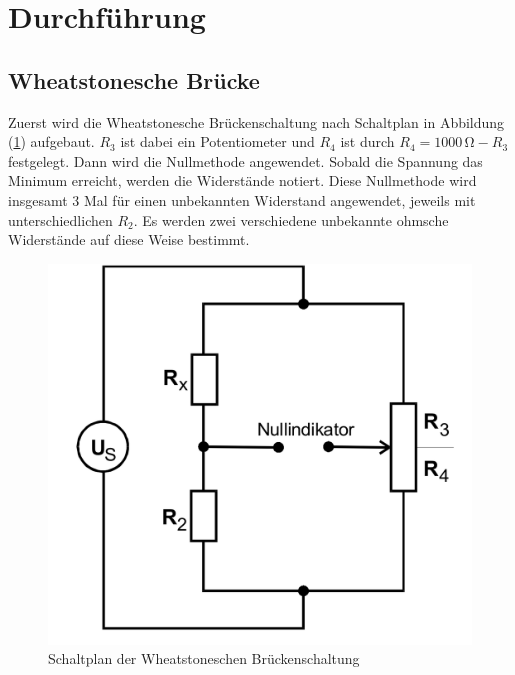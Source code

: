 \section{Durchführung}
%
\subsection{Wheatstonesche Brücke}
Zuerst wird die Wheatstonesche Brückenschaltung nach Schaltplan in Abbildung (\ref{pic:Wheatstonesche_Brueckenschaltung}) aufgebaut. $R_3$ ist dabei ein Potentiometer
und $R_4$ ist durch $R_4 = 1000 \, \unit{\ohm} - R_3 $ festgelegt. Dann wird die Nullmethode angewendet.
Sobald die Spannung das Minimum erreicht, werden die Widerstände notiert. Diese Nullmethode wird insgesamt 3 Mal für einen unbekannten Widerstand angewendet, jeweils
mit unterschiedlichen $R_2$. Es werden zwei verschiedene unbekannte ohmsche Widerstände auf diese Weise bestimmt.  
\begin{figure}[H]
    \centering
    \includegraphics[width=0.4\linewidth]{Wheatstonesche.png}
    \caption{Schaltplan der Wheatstoneschen Brückenschaltung}
    \label{pic:Wheatstonesche_Brueckenschaltung}
\end{figure}
